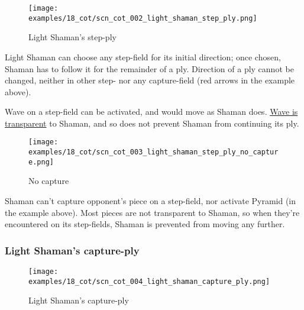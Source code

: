 \vspace*{-1.4\baselineskip}
\noindent
\begin{figure}[!h]
\texttt{[image: examples/18\_cot/scn\_cot\_002\_light\_shaman\_step\_ply.png]}
\vspace*{-1.4\baselineskip}
\caption{Light Shaman's step-ply}
\label{fig:scn_cot_002_light_shaman_step_ply}
\end{figure}

\vspace*{-0.4\baselineskip}
Light Shaman can choose any step-field for its initial direction; once chosen, Shaman
has to follow it for the remainder of a ply. Direction of a ply cannot be changed,
neither in other step- nor any capture-field (red arrows in the example above).

Wave on a step-field can be activated, and would move as Shaman does.
\hyperref[fig:scn_mv_07_wave_is_transparent]{Wave is transparent} to Shaman, and
so does not prevent Shaman from continuing its ply.

\noindent
\begin{wrapfigure}[8]{l}{0.4\textwidth}
\centering
\texttt{[image: examples/18\_cot/scn\_cot\_003\_light\_shaman\_step\_ply\_no\_capture.png]}
\vspace*{-1.4\baselineskip}
\caption{No capture}
\label{fig:scn_cot_003_light_shaman_step_ply_no_capture}
\end{wrapfigure}
Shaman can't capture opponent's piece on a step-field, nor activate Pyramid (in
the example above). Most pieces are not transparent to Shaman, so when they're
encountered on its step-fields, Shaman is prevented from moving any further.

\clearpage %

\subsubsection*{Light Shaman's capture-ply}
\label{sec:Conquest of Tlalocan/Shaman/Movement/Light Shaman's capture-ply}

\vspace*{-1.4\baselineskip}
\noindent
\begin{figure}[!h]
\texttt{[image: examples/18\_cot/scn\_cot\_004\_light\_shaman\_capture\_ply.png]}
\vspace*{-1.4\baselineskip}
\caption{Light Shaman's capture-ply}
\label{fig:scn_cot_004_light_shaman_capture_ply}
\end{figure}

